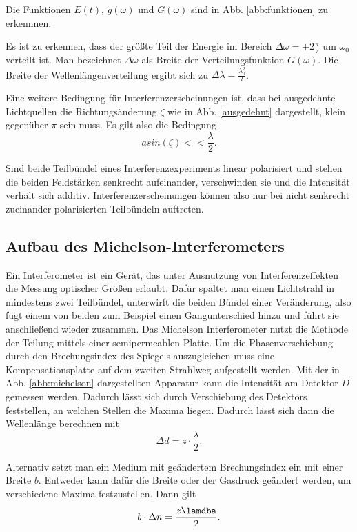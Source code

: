 Die Funktionen $E(t)$, $g(\omega)$ und $G(\omega)$ sind in Abb. \ref{abb:funktionen} zu erkennnen. 

Es ist zu erkennen, dass der größte Teil der Energie im Bereich $\Delta \omega =\pm 2 \frac{\pi}{\tau}$ um $\omega_0$ verteilt ist. Man bezeichnet $\Delta \omega$ als Breite der Verteilungsfunktion $G(\omega)$. Die Breite der Wellenlängenverteilung ergibt sich zu $\Delta \lambda = \frac{\lambda^{2}_0}{l}$.

Eine weitere Bedingung für Interferenzerscheinungen ist, dass bei ausgedehnte Lichtquellen die Richtungsänderung $\zeta$ wie in Abb. \ref{ausgedehnt} dargestellt, klein gegenüber $\pi$ sein muss. Es gilt also die Bedingung 
\begin{equation}
    a sin(\zeta) << \frac{\lambda}{2}.
    \label{eqn:zeta}
\end{equation}

Sind beide Teilbündel eines Interferenzexperiments linear polarisiert und stehen die beiden Feldstärken senkrecht aufeinander, verschwinden sie und die Intensität verhält sich additiv. Interferenzerscheinungen können also nur bei nicht senkrecht zueinander polarisierten Teilbündeln auftreten. 

\subsection{Aufbau des Michelson-Interferometers}

Ein Interferometer ist ein Gerät, das unter Ausnutzung von Interferenzeffekten die Messung optischer Größen erlaubt. Dafür spaltet man einen Lichtstrahl in mindestens zwei Teilbündel, unterwirft die beiden Bündel einer Veränderung, also fügt einem von beiden zum Beispiel einen Gangunterschied hinzu und führt sie anschließend wieder zusammen. Das Michelson Interferometer nutzt die Methode der Teilung mittels einer semipermeablen Platte. 
Um die Phasenverschiebung durch den Brechungsindex des Spiegels auszugleichen muss eine Kompensationsplatte auf dem zweiten Strahlweg aufgestellt werden. 
Mit der in Abb. \ref{abb:michelson} dargestellten Apparatur kann die Intensität am Detektor $D$ gemessen werden. Dadurch lässt sich durch Verschiebung des Detektors feststellen, an welchen Stellen die Maxima liegen. Dadurch lässt sich dann die Wellenlänge berechnen mit 
\begin{equation}
    \Delta d = z \cdot \frac{\lambda}{2}.
\end{equation}

Alternativ setzt man ein Medium mit geändertem Brechungsindex ein mit einer Breite $b$. 
Entweder kann dafür die Breite oder der Gasdruck geändert werden, um verschiedene Maxima festzustellen. 
Dann gilt 
\begin{equation}
    b \cdot \Delta n = \frac{z \lamdba}{2}.
\end{equation}


